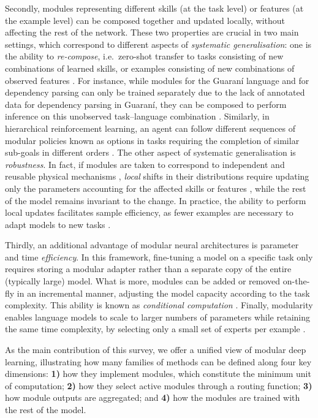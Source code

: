 \documentclass[10pt]{article} %
\begin{document}
Secondly, modules representing different skills (at the task level) or features (at the example level) can be composed together and updated locally, without affecting the rest of the network. These two properties are crucial in two main settings, which correspond to different aspects of \textit{systematic generalisation}: one is the ability to \textit{re-compose}, i.e.\ zero-shot transfer to tasks consisting of new combinations of learned skills, or examples consisting of new combinations of observed features \citep{hupkes2020compositionality}. For instance, while modules for the Guaran\'i language and for dependency parsing can only be trained separately due to the lack of annotated data for dependency parsing in Guaran\'i, they can be composed to perform inference on this unobserved task--language combination \citep{pfeiffer-etal-2020-mad}. Similarly, in hierarchical reinforcement learning, an agent can follow different sequences of modular policies known as options in tasks requiring the completion of similar sub-goals in different orders \citep{sutton1999between,precup2000temporal}.
The other aspect of systematic generalisation is \textit{robustness}. In fact, if modules are taken to correspond to independent and reusable physical mechanisms \citep{ScholkopfJPSZM12}, \textit{local} shifts in their distributions require updating only the parameters accounting for the affected skills or features \citep{goyal2019recurrent,9363924}, while the rest of the model remains invariant to the change. In practice, the ability to perform local updates facilitates sample efficiency, as fewer examples are necessary to adapt models to new tasks \citep{Bengio2020meta,ponti2022combining}.

Thirdly, an additional advantage of modular neural architectures is parameter and time \textit{efficiency}. In this framework, fine-tuning a model on a specific task only requires storing a modular adapter rather than a separate copy of the entire (typically large) model. What is more, modules can be added or removed on-the-fly in an incremental manner, adjusting the model capacity according to the task complexity. This ability is known as \textit{conditional computation} \citep{bengio2015conditional}. Finally, modularity enables language models to scale to larger numbers of parameters while retaining the same time complexity, by selecting only a small set of experts per example \citep{shazeer2017outrageously,fedus2021switch}.

As the main contribution of this survey, we offer a unified view of modular deep learning, illustrating how many families of methods can be defined along four key dimensions: \textbf{1)} how they implement modules, which constitute the minimum unit of computation; \textbf{2)} how they select active modules through a routing function; \textbf{3)} how module outputs are aggregated; and \textbf{4)} how the modules are trained with the rest of the model.
\end{document}
